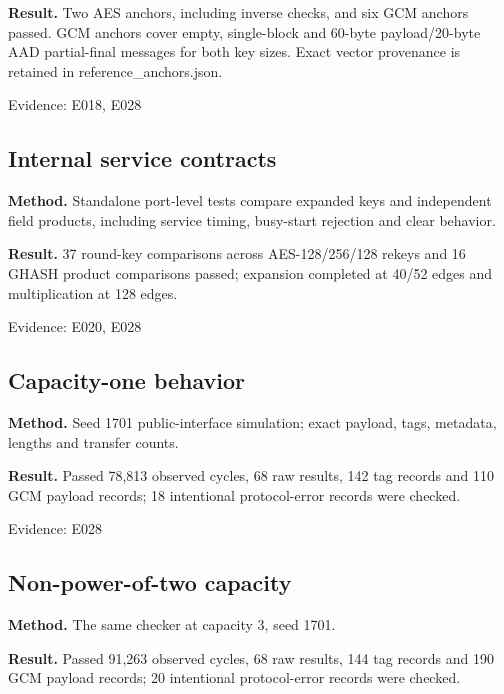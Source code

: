 \documentclass[11pt,a4paper]{article}
\begin{document}
\textbf{Result.} Two AES anchors,\allowbreak{} including inverse checks,\allowbreak{} and six GCM anchors passed. GCM anchors cover empty,\allowbreak{} single-block and 60-byte payload/\allowbreak{}20-byte AAD partial-final messages for both key sizes. Exact vector provenance is retained in reference\_\allowbreak{}anchors.json.

{\small Evidence: E018,\allowbreak{} E028}

\subsection{Internal service contracts}

\textbf{Method.} Standalone port-level tests compare expanded keys and independent field products,\allowbreak{} including service timing,\allowbreak{} busy-start rejection and clear behavior.

\textbf{Result.} 37 round-key comparisons across AES-128/\allowbreak{}256/\allowbreak{}128 rekeys and 16 GHASH product comparisons passed; expansion completed at 40/\allowbreak{}52 edges and multiplication at 128 edges.

{\small Evidence: E020,\allowbreak{} E028}

\subsection{Capacity-one behavior}

\textbf{Method.} Seed 1701 public-interface simulation; exact payload,\allowbreak{} tags,\allowbreak{} metadata,\allowbreak{} lengths and transfer counts.

\textbf{Result.} Passed 78,\allowbreak{}813 observed cycles,\allowbreak{} 68 raw results,\allowbreak{} 142 tag records and 110 GCM payload records; 18 intentional protocol-error records were checked.

{\small Evidence: E028}

\subsection{Non-power-of-two capacity}

\textbf{Method.} The same checker at capacity 3,\allowbreak{} seed 1701.

\textbf{Result.} Passed 91,\allowbreak{}263 observed cycles,\allowbreak{} 68 raw results,\allowbreak{} 144 tag records and 190 GCM payload records; 20 intentional protocol-error records were checked.
\end{document}

